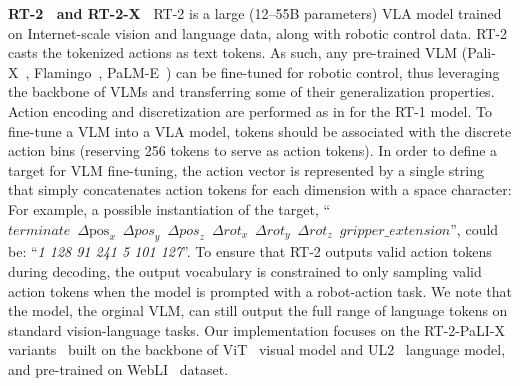 \noindent\textbf{ RT-2~\cite{rt-2} and RT-2-X~\cite{9}} RT-2 is a large (12--55B parameters) VLA model trained on Internet-scale vision and language data, along with robotic control data. 
RT-2 casts the tokenized actions as text tokens.
As such, any pre-trained VLM (\eg Pali-X~\cite{chen2023palix}, Flamingo~\cite{alayrac2022flamingo}, {P}a{LM}-E~\cite{driess2023palme}) can be fine-tuned for robotic control, thus leveraging the backbone of VLMs and transferring some of their generalization properties.
Action encoding and discretization are performed as in \cite{rt-1} for the RT-1 model. 
To fine-tune a VLM into a VLA model, tokens should be associated with the discrete action bins (\ie reserving 256 tokens to serve as action tokens). 
In order to define a target for VLM fine-tuning, the action vector is represented by a single string that simply concatenates action tokens for each dimension with a space character:
For example, a possible instantiation of the target,
``$\textit{terminate} \enspace \Delta \text{pos}_x \enspace \Delta \textit{pos}_y \enspace \Delta \textit{pos}_z \enspace \Delta \textit{rot}_x \enspace \Delta \textit{rot}_y \enspace \Delta \textit{rot}_z \enspace \textit{gripper\_extension}
$'',
could be: ``\textit{1 128 91 241 5 101 127}''.
To ensure that RT-2 outputs valid action tokens during decoding, the output vocabulary is
constrained to only sampling valid action tokens when the model is prompted with a robot-action task.
We note that the model, \ie the orginal VLM, can still output the full range of language tokens on standard vision-language tasks.
Our implementation focuses on the RT-2-PaLI-X variants~\cite{chen2023palix} built on the backbone of ViT~\cite{dosovitskiy2021image} visual model and UL2~\cite{tay2023ul2} language model, and pre-trained on WebLI~\cite{chen2023palix} dataset. %

